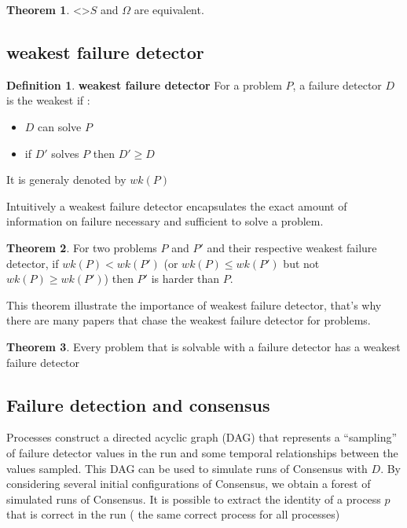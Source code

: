 \documentclass{article}
\theoremstyle{definition}
\newtheorem{definition}{Definition}[section]
\newtheorem{theorem}{Theorem}
\begin{document}
\begin{theorem}
<>$S$ and $\Omega$ are equivalent.
\end{theorem}

\subsection{weakest failure detector}

\begin{definition}\textbf{weakest failure detector}
For a problem $P$, a failure detector $D$ is the weakest if :
\begin{itemize}
\item $D$ can solve $P$
\item if $ D'$ solves  $P$ then $D' \geq D$
\end{itemize}
It is generaly denoted by $wk(P)$
\end{definition}

Intuitively a weakest failure detector encapsulates the exact amount of information on failure necessary and sufficient to solve a
problem.

\begin{theorem}
For two problems $P$ and $P'$ and their respective weakest failure detector, if $wk(P) < wk(P')$ (or  $wk(P) \leq wk(P')$ but not $wk(P) \geq wk(P')$) then $P'$ is harder than $P$.
\end{theorem}

This theorem illustrate the importance of weakest failure detector, that's why there are many papers that chase the weakest failure detector for problems.

\begin{theorem}
Every problem that is solvable with a failure detector has a weakest failure detector
\end{theorem}

\subsection{Failure detection and consensus}

Processes construct a directed acyclic graph (DAG) that represents a “sampling” of failure detector values in the run and some temporal relationships between the values sampled. This DAG can be used to simulate runs of Consensus with $D$. By considering several initial configurations of Consensus,
we obtain a forest of simulated runs of Consensus. It is possible to extract the identity of a process $p$ that is correct in the run ( the same correct process for all processes)
\end{document}
